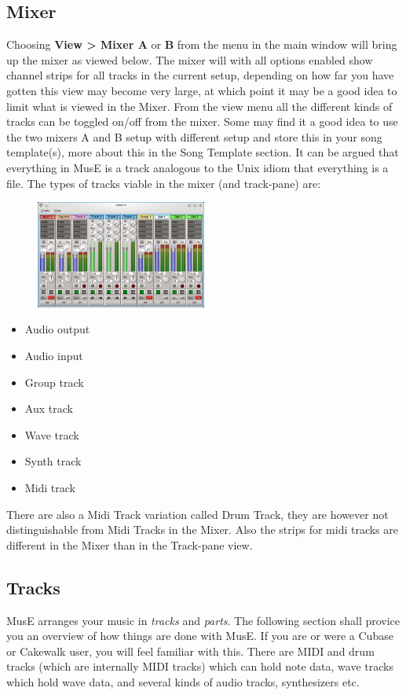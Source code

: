 \documentclass[a4paper]{report}
\newcommand{\menu}[1]{\textbf{#1}}
\begin{document}
\subsection{Mixer}
Choosing \menu{View > Mixer A} or \menu{B} from the menu in the main
window will bring up the mixer as viewed below. The mixer will with all
options enabled show channel strips for all tracks in the current setup,
depending on how far you have gotten this view may become very large,
at which point it may be a good idea to limit what is viewed in the
Mixer. From the view menu all the different kinds of tracks can be
toggled on/off from the mixer. Some may find it a good idea to use the
two mixers A and B setup with different setup and store this in your
song template(s), more about this in the Song Template section. It can
be argued that everything in MusE is a track analogous to the Unix
idiom that everything is a file.
The types of tracks viable in the mixer (and track-pane) are:
\begin{figure}
\includegraphics[width=0.5\textwidth]{pics/mixer}
\end{figure}
\begin {itemize}
\item Audio output
\item Audio input
\item Group track
\item Aux track
\item Wave track
\item Synth track
\item Midi track
\end{itemize}


There are also a Midi Track variation called Drum Track, they are 
however not distinguishable from Midi Tracks in the Mixer. Also the 
strips for midi tracks are different in the Mixer than in the 
Track-pane view.


\subsection{Tracks}
MusE arranges your music in \emph{tracks} and \emph{parts}. The following
section shall provice you an overview of how things are done with MusE.
If you are or were a Cubase or Cakewalk user, you will feel familiar with
this. There are
MIDI and drum tracks (which are internally MIDI tracks) which can hold
note data, wave tracks which hold wave data, and several kinds of
audio tracks, synthesizers etc.
\end{document}
